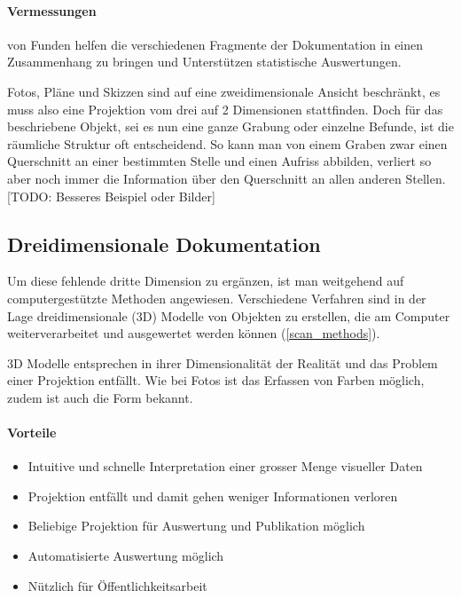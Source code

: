 \documentclass{paper}
\begin{document}
			\paragraph{Vermessungen} von Funden helfen die verschiedenen Fragmente der Dokumentation in einen Zusammenhang zu bringen und Unterstützen statistische Auswertungen.
			
			\mbox{}
			
			Fotos, Pläne und Skizzen sind auf eine zweidimensionale Ansicht beschränkt, es muss also eine Projektion vom drei auf 2 Dimensionen stattfinden. Doch für das beschriebene Objekt, sei es nun eine ganze Grabung oder einzelne Befunde, ist die räumliche Struktur oft entscheidend.
			So kann man von einem Graben zwar einen Querschnitt an einer bestimmten Stelle und einen Aufriss abbilden, verliert so aber noch immer die Information über den Querschnitt an allen anderen Stellen.  
			[TODO: Besseres Beispiel oder Bilder]\\
		
		\subsection{Dreidimensionale Dokumentation}
			Um diese fehlende dritte Dimension zu ergänzen, ist man weitgehend auf computergestützte Methoden angewiesen. Verschiedene Verfahren sind in der Lage dreidimensionale (3D) Modelle von Objekten zu erstellen, die am Computer weiterverarbeitet und ausgewertet werden können (\autoref{scan_methods}).
			
			3D Modelle entsprechen in ihrer Dimensionalität der Realität und das Problem einer Projektion entfällt.
			Wie bei Fotos ist das Erfassen von Farben möglich, zudem ist auch die Form bekannt.
			
			\paragraph{Vorteile}
			\begin{itemize}
				\item
					Intuitive und schnelle Interpretation einer grosser Menge visueller Daten
				\item
					Projektion entfällt und damit gehen weniger Informationen verloren
				\item
					Beliebige Projektion für Auswertung und Publikation möglich
				\item
					Automatisierte Auswertung möglich
				\item
					Nützlich für Öffentlichkeitsarbeit
			\end{itemize}
			
\end{document}
